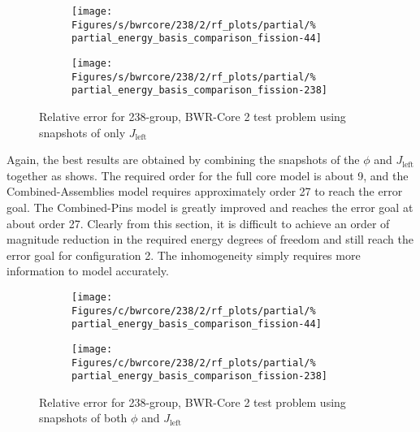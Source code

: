 \begin{figure*}[tb]
    \centering
    \begin{subfigure}{0.5\textwidth}
        \centering
    \texttt{[image: Figures/s/bwrcore/238/2/rf\_plots/partial/\%
        partial\_energy\_basis\_comparison\_fission-44]}
    \end{subfigure}%
    \begin{subfigure}{0.5\textwidth}
        \centering
    \texttt{[image: Figures/s/bwrcore/238/2/rf\_plots/partial/\%
        partial\_energy\_basis\_comparison\_fission-238]}
    \end{subfigure}
    \caption{Relative error for 238-group, BWR-Core 2 test problem using 
        snapshots of only $J_{\text{left}}$}
    \label{fig:BWR2_partial-238}
\end{figure*}

Again, the best results are obtained by combining the snapshots of the 
$\phi$ and $J_{\text{left}}$ together as  shows.  The required order 
for the full core model is 
about 9, and the Combined-Assemblies model requires approximately order 27 to 
reach the error goal.  The Combined-Pins model is greatly improved and reaches 
the error goal at about order 27.  Clearly from this section, it is difficult 
to achieve an order of magnitude reduction in the required energy degrees of 
freedom and still reach the error goal for configuration 2.  The inhomogeneity 
simply requires more information to model accurately.

\begin{figure*}[tb]
    \centering
    \begin{subfigure}{0.5\textwidth}
        \centering
    \texttt{[image: Figures/c/bwrcore/238/2/rf\_plots/partial/\%
        partial\_energy\_basis\_comparison\_fission-44]}
    \end{subfigure}%
    \begin{subfigure}{0.5\textwidth}
        \centering
    \texttt{[image: Figures/c/bwrcore/238/2/rf\_plots/partial/\%
        partial\_energy\_basis\_comparison\_fission-238]}
    \end{subfigure}
    \caption{Relative error for 238-group, BWR-Core 2 test problem using 
        snapshots of both $\phi$ and $J_{\text{left}}$}
    \label{fig:BWR2_combined-238}
\end{figure*}


